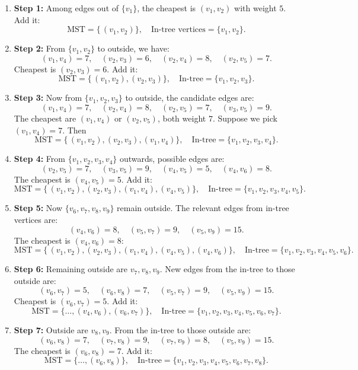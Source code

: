 \documentclass[a4paper,12pt]{article}
\begin{document}
\begin{enumerate}
\begin{enumerate}
    \item \textbf{Step 1:} Among edges out of \(\{v_1\}\), the cheapest is \((v_1,v_2)\) with weight \(5\). Add it:
    \[
    \text{MST} = \{\,(v_1,v_2)\}, \quad \text{In-tree vertices} = \{v_1,v_2\}.
    \]

    \item \textbf{Step 2:} From \(\{v_1,v_2\}\) to outside, we have:
    \[
    (v_1,v_4)=7,\quad (v_2,v_3)=6,\quad (v_2,v_4)=8,\quad (v_2,v_5)=7.
    \]
    Cheapest is \((v_2,v_3)=6\). Add it:
    \[
    \text{MST} = \{\,(v_1,v_2),(v_2,v_3)\}, \quad \text{In-tree} = \{v_1,v_2,v_3\}.
    \]

    \item \textbf{Step 3:} Now from \(\{v_1,v_2,v_3\}\) to outside, the candidate edges are:
    \[
    (v_1,v_4)=7, \quad (v_2,v_4)=8, \quad (v_2,v_5)=7, \quad (v_3,v_5)=9.
    \]
    The cheapest are \((v_1,v_4)\) or \((v_2,v_5)\), both weight \(7\). Suppose we pick \((v_1,v_4)=7\). Then
    \[
    \text{MST} = \{\,(v_1,v_2),(v_2,v_3),(v_1,v_4)\}, \quad \text{In-tree} = \{v_1,v_2,v_3,v_4\}.
    \]

    \item \textbf{Step 4:} From \(\{v_1,v_2,v_3,v_4\}\) outwards, possible edges are:
    \[
    (v_2,v_5)=7, \quad (v_3,v_5)=9, \quad (v_4,v_5)=5, \quad (v_4,v_6)=8.
    \]
    The cheapest is \((v_4,v_5)=5\).  Add it:
    \[
    \text{MST} = \{\,(v_1,v_2),(v_2,v_3),(v_1,v_4),(v_4,v_5)\}, \quad \text{In-tree} = \{v_1,v_2,v_3,v_4,v_5\}.
    \]

    \item \textbf{Step 5:} Now \(\{v_6,v_7,v_8,v_9\}\) remain outside. The relevant edges from in-tree vertices are:
    \[
    (v_4,v_6)=8, \quad (v_5,v_7)=9, \quad (v_5,v_9)=15.
    \]
    The cheapest is \((v_4,v_6)=8\):
    \[
    \text{MST} = \{\,(v_1,v_2),(v_2,v_3),(v_1,v_4),(v_4,v_5),(v_4,v_6)\}, \quad \text{In-tree} = \{v_1,v_2,v_3,v_4,v_5,v_6\}.
    \]

    \item \textbf{Step 6:} Remaining outside are \(v_7,v_8,v_9\).  New edges from the in-tree to those outside are:
    \[
    (v_6,v_7)=5,\quad (v_6,v_8)=7,\quad (v_5,v_7)=9,\quad (v_5,v_9)=15.
    \]
    Cheapest is \((v_6,v_7)=5\).  Add it:
    \[
    \text{MST} 
    = \bigl\{\dots, (v_4,v_6),(v_6,v_7)\bigr\}, 
    \quad \text{In-tree} = \{v_1,v_2,v_3,v_4,v_5,v_6,v_7\}.
    \]

    \item \textbf{Step 7:} Outside are \(v_8,v_9\). From the in-tree to those outside are:
    \[
    (v_6,v_8)=7,\quad (v_7,v_8)=9,\quad (v_7,v_9)=8,\quad (v_5,v_9)=15.
    \]
    The cheapest is \((v_6,v_8)=7\).  Add it:
    \[
    \text{MST} = \{\dots,(v_6,v_8)\}, \quad \text{In-tree} = \{v_1,v_2,v_3,v_4,v_5,v_6,v_7,v_8\}.
    \]


\end{enumerate}
\end{enumerate}
\end{document}
